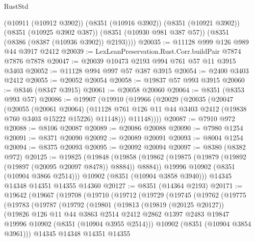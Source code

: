 \begin{lexlean}{RustStd}
\begin{coremodule}
        (@10911 (@10912 @3902))
        (@8351 (@10916 @3902))
        (@8351 (@10921 @3902))
        (@8351 (@10925 @3902 @387))
        (@8351 (@10930 @981 @387 @57))
        (@8351 (@8386 (@8387 (@10936 @3902)) @2193))))
@20035 := @11128 @999 @126 @989 @44 @3917 @2412
@20039 := LexLeanPreservation.Rust.Corr.buildPair @7874 @7876 @7878
@20047 := @20039 @10473 @2193 @994 @761 @57 @11 @3915 @3403
@20052 := @11128 @994 @997 @57 @387 @3915
@20054 := @2400 @3403 @2412
@20055 := @20052 @20054
@20058 := @19837 @57 @993 @3915
@20060 := @8346 (@8347 @3915)
@20061 := @20058 @20060
@20064 := @8351 (@8353 @993 @57)
@20086 := @19907
    (@19910
      (@19966
        (@20029
          (@20035
            (@20047
              (@20055
                (@20061 @20064)
                (@11128 @761 @126 @11 @44 @3403 @2412 (@19838 @760 @3403 @15222 @15226) @11148)))
            @11148))))
@20087 := @7910 @972
@20088 := @8106 @20087
@20089 := @20086 @20088
@20090 := @7980 @1254
@20091 := @8371 @20090
@20092 := @20089 @20091
@20093 := @8004 @1254
@20094 := @8375 @20093
@20095 := @20092 @20094
@20097 := @8380 (@8382 @972)
@20125 := @19825
    (@19848
      (@19858
        (@19862 (@19875 (@19879 (@19892 (@19897 (@20095 @20097 @8478)) @8884)) @8884))
        @19996
        @10902
        (@8351 (@10904 @3866 @2514)))
      @10902
      (@8351 (@10904 @3858 @3940)))
    @14345
    @14348
    @14351
    @14355
    @14360
@20127 := @8351 (@14364 @2193)
@20171 := @19642
    (@19667
      (@19708
        (@19710
          (@19712
            (@19729
              (@19745
                (@19762
                  (@19775
                    (@19783
                      (@19787
                        (@19792
                          (@19801
                            (@19813
                              (@19819 (@20125 @20127))
                              (@19826
                                @126
                                @11
                                @44
                                @3863
                                @2514
                                @2412
                                @2862
                                @1397
                                @2483
                                @19847
                                @19996
                                @10902
                                (@8351 (@10904 @3955 @2514)))
                              @10902
                              (@8351 (@10904 @3854 @3961)))
                            @14345
                            @14348
                            @14351
                            @14355

\end{coremodule}
\end{lexlean}
